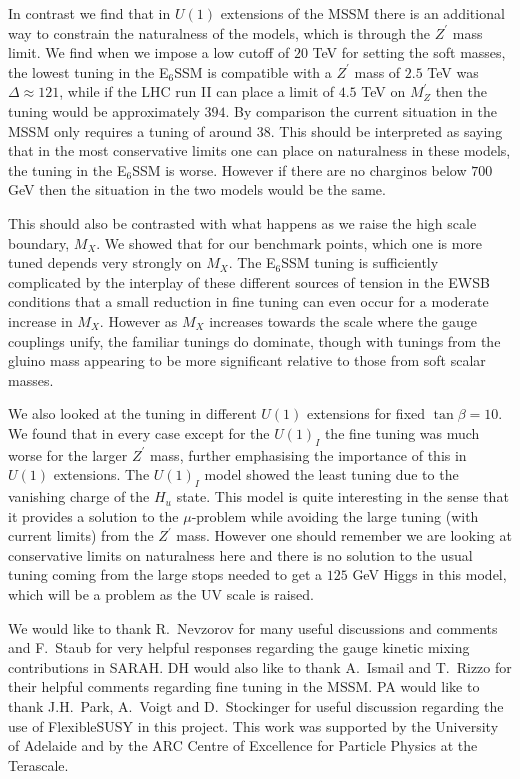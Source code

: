 \documentclass[preprint,amsmath,amssymb,aps,superscriptaddress,prd,showpacs,floatfix,nofootinbib]{revtex4-1}
\begin{document}
In contrast we find that in $U(1)$ extensions of the MSSM there is an
additional way to constrain the naturalness of the models, which is
through the $Z^\prime$ mass limit.  We find when we impose a low
cutoff of $20$ TeV for setting the soft masses, the lowest tuning in
the E$_6$SSM is compatible with a $Z^\prime$ mass of $2.5$ TeV was
$\Delta \approx 121$, while if the LHC run II can place a limit of
$4.5$ TeV on $M_Z^\prime$ then the tuning would be approximately $394$.
By comparison the current situation in the MSSM only requires a tuning
of around $38$. This should be interpreted as saying that in
the most conservative limits one can place on naturalness in these
models, the tuning in the E$_6$SSM is worse.  However if there are no
charginos below $700$ GeV then the situation in the two models would
be the same.

This should also be contrasted with what happens as we raise the high
scale boundary, $M_X$.  We showed that for our benchmark points, which
one is more tuned depends very strongly on $M_X$.  The E$_6$SSM tuning
is sufficiently complicated by the interplay of these different
sources of tension in the EWSB conditions that a small reduction in
fine tuning can even occur for a moderate increase in $M_X$.  However
as $M_X$ increases towards the scale where the gauge couplings unify,
the familiar tunings do dominate, though with tunings from the gluino
mass appearing to be more significant relative to those from soft
scalar masses.  

We also looked at the tuning in different $U(1)$ extensions for fixed
$\tan \beta = 10$.  We found that in every case except for the
$U(1)_I$ the fine tuning was much worse for the larger $Z^\prime$
mass, further emphasising the importance of this in $U(1)$ extensions.
The $U(1)_I$ model showed the least tuning due to
the vanishing charge of the $H_u$ state. This model is quite
interesting in the sense that it provides a solution to the
$\mu$-problem while avoiding the large tuning (with current limits)
from the $Z^\prime$ mass. However one should remember we are looking
at conservative limits on naturalness here and there is no solution to
the usual tuning coming from the large stops needed to get a $125$ GeV
Higgs in this model, which will be a problem as the UV scale is raised. 



\acknowledgements We would like to thank R.~Nevzorov for many useful
discussions and comments and F.~Staub for very helpful responses
regarding the gauge kinetic mixing contributions in SARAH. DH would
also like to thank A.~Ismail and T.~Rizzo for their helpful comments
regarding fine tuning in the MSSM. 
PA would like to thank J.H.~Park, A.~Voigt and D.~Stockinger for 
useful discussion regarding the use of FlexibleSUSY in this project. 
This work was supported by the University of Adelaide and by the ARC 
Centre of Excellence for Particle Physics at the Terascale.
\end{document}
